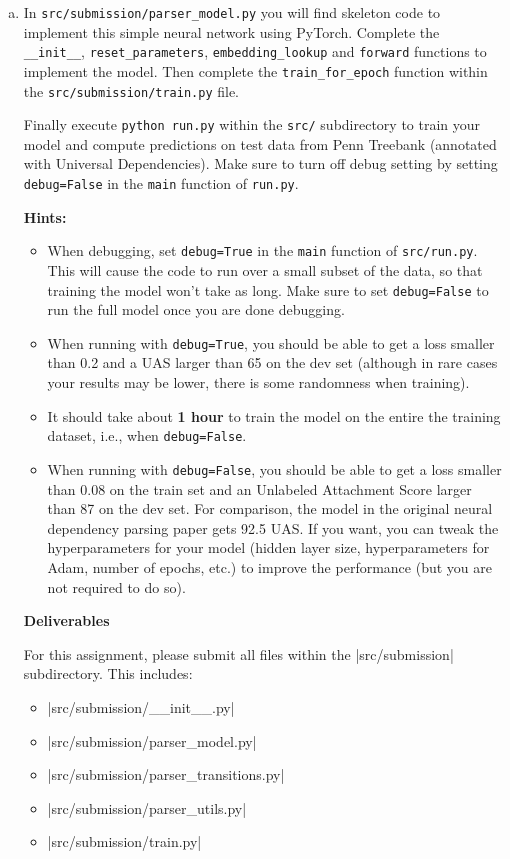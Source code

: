 \begin{enumerate}[(a)]
    \item {} In \texttt{src/submission/parser\_model.py} you will find skeleton code to implement this simple neural network using PyTorch. Complete the \texttt{\_\_init\_\_}, \texttt{reset\_parameters}, \texttt{embedding\_lookup} and \texttt{forward} functions to implement the model. Then complete the \texttt{train\_for\_epoch} function within the \texttt{src/submission/train.py} file. \newline
   
    Finally execute \texttt{python run.py} within the \texttt{src/} subdirectory to train your model and compute predictions
    on test data from Penn Treebank (annotated with Universal Dependencies). Make sure to turn off debug setting by setting \texttt{debug=False} in the \texttt{main} function of \texttt{run.py}.
    
    \textbf{Hints:}
    \begin{itemize}
        \item
            When debugging, set \texttt{debug=True} in the \texttt{main} function of \texttt{src/run.py}. This will cause the code to run over a small subset of the data, so that training the model won't take as long. Make sure to set \texttt{debug=False} to run the full model once you are done debugging.

        \item
            When running with \texttt{debug=True}, you should be able to get a loss smaller than 0.2 and a UAS larger than 65 on the dev set (although in rare cases your results may be lower, there is some randomness when training).
            
        \item It should take about \textbf{1 hour} to train the model on the entire the training dataset, i.e., when \texttt{debug=False}.
        
        \item When running with \texttt{debug=False}, you should be able to get a loss smaller than 0.08 on the train set and an Unlabeled Attachment Score larger than 87 on the dev set. For comparison, the model in the original neural dependency parsing paper gets 92.5 UAS. If you want, you can tweak the hyperparameters for your model (hidden layer size, hyperparameters for Adam, number of epochs, etc.) to improve the performance (but you are not required to do so).
    \end{itemize}
    \clearpage

    \textbf{Deliverables}

    For this assignment, please submit all files within the |src/submission| subdirectory.  This includes:
    \begin{itemize}
        \item |src/submission/__init__.py|
        \item |src/submission/parser_model.py|
        \item |src/submission/parser_transitions.py|
        \item |src/submission/parser_utils.py|
        \item |src/submission/train.py|
    \end{itemize}   
\end{enumerate}